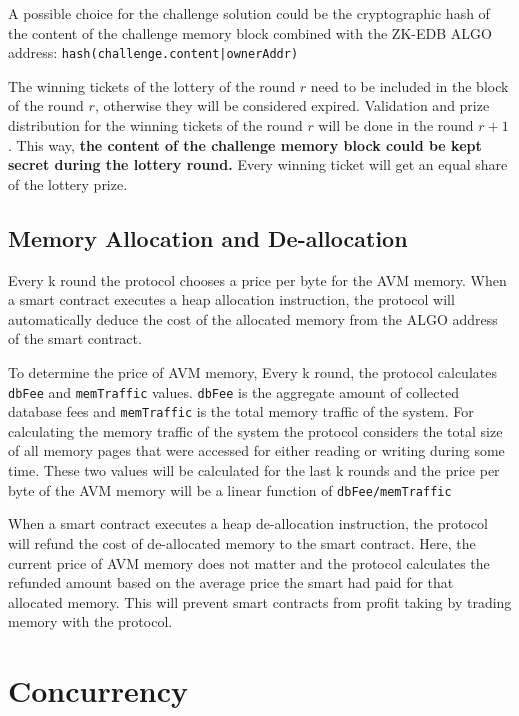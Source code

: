 \documentclass[11pt, A4]{article}
\begin{document}
    A possible choice for the challenge solution could be the cryptographic hash of the content of the challenge
    memory block combined with the ZK-EDB ALGO address: \texttt{hash(challenge.content|ownerAddr)}

    The winning tickets of the lottery of the round \(r\) need to be included in the block of the round \(r\),
    otherwise they will be considered expired. Validation and prize distribution for the winning tickets of the round
    \(r\) will be done in the round \(r + 1\). This way, \textbf{the content of the challenge memory block could be
    kept secret during the lottery round.} Every winning ticket will get an equal share of the lottery prize.

    \subsection{Memory Allocation and De-allocation}\label{subsec:memory-allocation-and-de-allocation}

    Every k round the protocol chooses a price per byte for the AVM memory. When a smart contract executes a heap
    allocation instruction, the protocol will automatically deduce the cost of the allocated memory from the ALGO
    address of the smart contract.

    To determine the price of AVM memory, Every k round, the protocol calculates \texttt{dbFee} and
    \texttt{memTraffic} values. \texttt{dbFee} is the aggregate amount of collected database fees and
    \texttt{memTraffic} is the total memory traffic of the system. For calculating the memory traffic of the system
    the protocol considers the total size of all memory pages that were accessed for either reading or writing during
    some time. These two values will be calculated for the last k rounds and the price per byte of the AVM memory
    will be a linear function of \texttt{dbFee/memTraffic}

    When a smart contract executes a heap de-allocation instruction, the protocol will refund the cost of
    de-allocated memory to the smart contract. Here, the current price of AVM memory does not matter and the protocol
    calculates the refunded amount based on the average price the smart had paid for that allocated memory. This will
    prevent smart contracts from profit taking by trading memory with the protocol.


    \section{Concurrency}\label{sec:concurrency}
\end{document}
